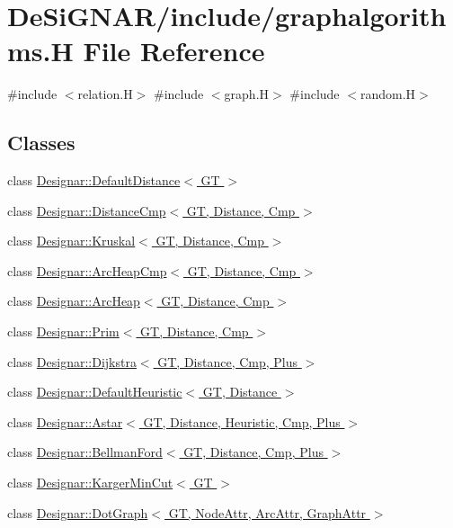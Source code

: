 \hypertarget{graphalgorithms_8_h}{}\section{De\+Si\+G\+N\+A\+R/include/graphalgorithms.H File Reference}
\label{graphalgorithms_8_h}
{\ttfamily \#include $<$relation.\+H$>$}\newline
{\ttfamily \#include $<$graph.\+H$>$}\newline
{\ttfamily \#include $<$random.\+H$>$}\newline
\subsection*{Classes}
\begin{DoxyCompactItemize}
\item 
class \hyperlink{class_designar_1_1_default_distance}{Designar\+::\+Default\+Distance$<$ G\+T $>$}
\item 
class \hyperlink{class_designar_1_1_distance_cmp}{Designar\+::\+Distance\+Cmp$<$ G\+T, Distance, Cmp $>$}
\item 
class \hyperlink{class_designar_1_1_kruskal}{Designar\+::\+Kruskal$<$ G\+T, Distance, Cmp $>$}
\item 
class \hyperlink{class_designar_1_1_arc_heap_cmp}{Designar\+::\+Arc\+Heap\+Cmp$<$ G\+T, Distance, Cmp $>$}
\item 
class \hyperlink{class_designar_1_1_arc_heap}{Designar\+::\+Arc\+Heap$<$ G\+T, Distance, Cmp $>$}
\item 
class \hyperlink{class_designar_1_1_prim}{Designar\+::\+Prim$<$ G\+T, Distance, Cmp $>$}
\item 
class \hyperlink{class_designar_1_1_dijkstra}{Designar\+::\+Dijkstra$<$ G\+T, Distance, Cmp, Plus $>$}
\item 
class \hyperlink{class_designar_1_1_default_heuristic}{Designar\+::\+Default\+Heuristic$<$ G\+T, Distance $>$}
\item 
class \hyperlink{class_designar_1_1_astar}{Designar\+::\+Astar$<$ G\+T, Distance, Heuristic, Cmp, Plus $>$}
\item 
class \hyperlink{class_designar_1_1_bellman_ford}{Designar\+::\+Bellman\+Ford$<$ G\+T, Distance, Cmp, Plus $>$}
\item 
class \hyperlink{class_designar_1_1_karger_min_cut}{Designar\+::\+Karger\+Min\+Cut$<$ G\+T $>$}
\item 
class \hyperlink{class_designar_1_1_dot_graph}{Designar\+::\+Dot\+Graph$<$ G\+T, Node\+Attr, Arc\+Attr, Graph\+Attr $>$}
\end{DoxyCompactItemize}
